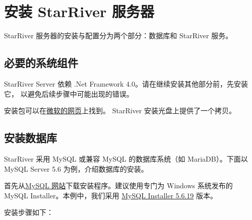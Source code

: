 \section{安装 StarRiver
服务器}\label{ux5b89ux88c5-starriver-ux670dux52a1ux5668}

StarRiver 服务器的安装与配置分为两个部分：数据库和 StarRiver 服务。

\subsection{必要的系统组件}\label{ux5fc5ux8981ux7684ux7cfbux7edfux7ec4ux4ef6}

StarRiver Server 依赖 .Net Framework
4.0。请在继续安装其他部分前，先安装它， 以避免后续步骤中可能出现的错误。

安装包可以在\href{https://www.microsoft.com/zh-cn/download/details.aspx?id=17718}{微软的网页}上找到。
StarRiver 安装光盘上提供了一个拷贝。

\subsection{安装数据库}\label{ux5b89ux88c5ux6570ux636eux5e93}

StarRiver 采用 MySQL 或兼容 MySQL 的数据库系统（如 MariaDB）。下面以
MySQL Server 5.6 为例，介绍数据库的安装。

首先从\href{http://dev.mysql.com/downloads/mysql/}{MySQL
网站}下载安装程序。建议使用专门为 Windows 系统发布的 MySQL
Installer。本例中，我们采用
\href{http://dev.mysql.com/downloads/windows/installer/5.6.html}{MySQL
Installer 5.6.19} 版本。

安装步骤如下：

